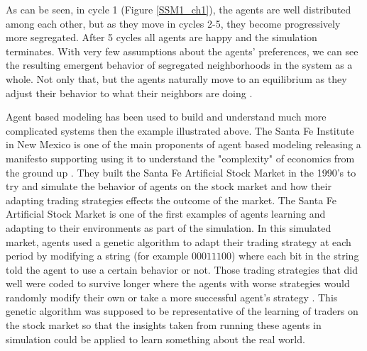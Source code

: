 \documentclass[12pt,twoside]{reedthesis}
\begin{document}
As can be seen, in cycle 1 (Figure \ref{SSM1_ch1}), the agents are well distributed among each other, but as they move in cycles 2-5, they become progressively more segregated. After 5 cycles all agents are happy and the simulation terminates. With very few assumptions about the agents' preferences, we can see the resulting emergent behavior of segregated neighborhoods in the system as a whole. Not only that, but the agents naturally move to an equilibrium as they adjust their behavior to what their neighbors are doing \citep{Sargent2019}. 

Agent based modeling has been used to build and understand much more complicated systems then the example illustrated above. The Santa Fe Institute in New Mexico is one of the main proponents of agent based modeling releasing a manifesto supporting using it to understand the "complexity" of economics from the ground up \citep{Backhouse2016}. They built the Santa Fe Artificial Stock Market in the 1990's to try and simulate the behavior of agents on the stock market and how their adapting trading strategies effects the outcome of the market. The Santa Fe Artificial Stock Market is one of the first examples of agents learning and adapting to their environments as part of the simulation\citep{LeBaron2002}. In this simulated market, agents used a genetic algorithm to adapt their trading strategy at each period by modifying a string (for example $00011100$) where each bit in the string told the agent to use a certain behavior or not. Those trading strategies that did well were coded to survive longer where the agents with worse strategies would randomly modify their own or take a more successful agent's strategy \citep{Arthur1992}. This genetic algorithm was supposed to be representative of the learning of traders on the stock market so that the insights taken from running these agents in simulation could be applied to learn something about the real world. 
\end{document}
